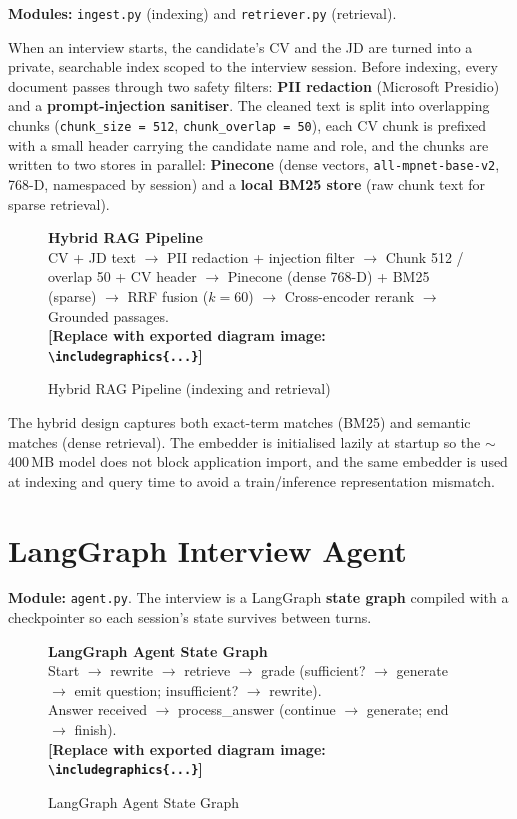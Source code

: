 \documentclass[12pt,a4paper,oneside]{report}
\newcommand{\diagramplaceholder}[1]{%
  \begin{tcolorbox}[
    colback=gray!5, colframe=gray!50,
    boxrule=0.4pt, arc=2pt,
    left=10pt, right=10pt, top=8pt, bottom=8pt,
    fontupper=\small\itshape
  ]
  \centering #1\\[4pt]
  \textbf{[Replace with exported diagram image: \texttt{\textbackslash includegraphics\{...\}}]}
  \end{tcolorbox}%
}
\begin{document}
\textbf{Modules:} \texttt{ingest.py} (indexing) and \texttt{retriever.py} (retrieval).

When an interview starts, the candidate's CV and the JD are turned into a private, searchable
index scoped to the interview session. Before indexing, every document passes through two
safety filters: \textbf{PII redaction} (Microsoft Presidio) and a \textbf{prompt-injection
sanitiser}. The cleaned text is split into overlapping chunks (\texttt{chunk\_size = 512},
\texttt{chunk\_overlap = 50}), each CV chunk is prefixed with a small header carrying the
candidate name and role, and the chunks are written to two stores in parallel:
\textbf{Pinecone} (dense vectors, \texttt{all-mpnet-base-v2}, 768-D, namespaced by session)
and a \textbf{local BM25 store} (raw chunk text for sparse retrieval).

\begin{figure}[H]
\centering
\diagramplaceholder{%
  \textbf{Hybrid RAG Pipeline}\\
  CV + JD text $\to$ PII redaction + injection filter $\to$ Chunk 512 / overlap 50 + CV header $\to$
  Pinecone (dense 768-D) + BM25 (sparse) $\to$ RRF fusion ($k=60$) $\to$
  Cross-encoder rerank $\to$ Grounded passages.%
}
\caption{Hybrid RAG Pipeline (indexing and retrieval)}
\label{fig:rag}
\end{figure}

The hybrid design captures both exact-term matches (BM25) and semantic matches (dense
retrieval). The embedder is initialised lazily at startup so the $\sim$400\,MB model does not
block application import, and the same embedder is used at indexing and query time to avoid a
train/inference representation mismatch.

\section{LangGraph Interview Agent}

\textbf{Module:} \texttt{agent.py}. The interview is a LangGraph \textbf{state graph}
compiled with a checkpointer so each session's state survives between turns.

\begin{figure}[H]
\centering
\diagramplaceholder{%
  \textbf{LangGraph Agent State Graph}\\
  Start $\to$ rewrite $\to$ retrieve $\to$ grade (sufficient? $\to$ generate $\to$ emit question; insufficient? $\to$ rewrite).\\
  Answer received $\to$ process\_answer (continue $\to$ generate; end $\to$ finish).%
}
\caption{LangGraph Agent State Graph}
\label{fig:langgraph}
\end{figure}
\end{document}
